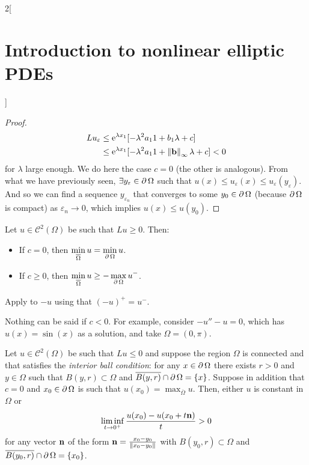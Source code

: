 \documentclass[../../../main_math.tex]{subfiles}
\begin{document}
\begin{multicols}{2}[\section{Introduction to nonlinear elliptic PDEs}]
\begin{proof}
    \begin{align*}
      Lu_\varepsilon & \leq \mathrm{e}^{\lambda x_1}[-\lambda^2a_11+b_1\lambda+c]                    \\
                     & \leq \mathrm{e}^{\lambda x_1}[-\lambda^2a_11+\left\|\boldsymbol{\mathrm{b}}\right\|_\infty\lambda+c]<0
    \end{align*}
    for $\lambda$ large enough. We do here the case $c=0$ (the other is analogous). From what we have previously seen, $\exists y_\varepsilon\in\operatorname{\partial}{\Omega}$ such that $u(x)\leq u_\varepsilon(x)\leq u_\varepsilon(y_\varepsilon)$. And so we can find a sequence $y_{\varepsilon_n}$ that converges to some $y_0\in\operatorname{\partial}{\Omega}$ (because $\operatorname{\partial}{\Omega}$ is compact) as $\varepsilon_n\to 0$, which implies $u(x)\leq u(y_0)$.
  \end{proof}
  \begin{theorem}
    Let $u\in \mathcal{C}^2(\Omega)$ be such that $Lu\geq 0$. Then:
    \begin{itemize}
      \item If $c=0$, then $\displaystyle \min_{\overline{\Omega}}u=\min_{\operatorname{\partial}{\Omega}}u$.
      \item If $c\geq 0$, then $\displaystyle \min_{\overline{\Omega}} u \geq -\max_{\operatorname{\partial}{\Omega}}u^-$.
    \end{itemize}
  \end{theorem}
  \begin{sproof}
    Apply  to $-u$ using that ${(-u)}^+=u^-$.
  \end{sproof}
  \begin{remark}
    Nothing can be said if $c<0$. For example, consider $-u''-u=0$, which has $u(x)=\sin(x)$ as a solution, and take $\Omega=(0,\pi)$.
  \end{remark}
  \begin{lemma}\label{INEPDE:Hopf}
    Let $u\in \mathcal{C}^2(\Omega)$ be such that $Lu\leq 0$ and suppose the region $\Omega$ is connected and that satisfies the \emph{interior ball condition}: for any $x\in \operatorname{\partial}{\Omega}$ there exists $r>0$ and $y\in \Omega$ such that $B(y,r)\subset \Omega$ and $\overline{B(y,r)}\cap \operatorname{\partial}{\Omega}=\{x\}$. Suppose in addition that $c=0$ and $x_0\in\operatorname{\partial}\Omega$ is such that $\displaystyle u(x_0)=\max_{\overline{\Omega}}u$. Then, either $u$ is constant in $\Omega$ or
    $$
      \liminf_{t\to 0^+}\frac{u(x_0) - u(x_0+t\boldsymbol{\mathrm{n}})}{t}>0
    $$
    for any vector $\boldsymbol{\mathrm{n}}$ of the form $\boldsymbol{\mathrm{n}}=\frac{x_0-y_0}{\left\|x_0-y_0\right\|}$ with $B(y_0,r)\subset \Omega$ and $\overline{B(y_0,r)}\cap \operatorname{\partial}{\Omega}=\{x_0\}$.

\end{lemma}
\end{multicols}
\end{document}
